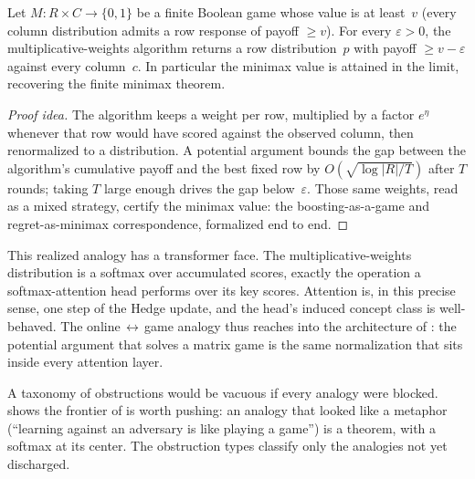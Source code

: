 \begin{thm}
\label{thm:mwu-minimax}
Let $M \colon R \times C \to \{0,1\}$ be a finite Boolean game whose value
is at least~$v$ (every column distribution admits a row response of payoff
$\geq v$). For every $\varepsilon > 0$, the multiplicative-weights
algorithm returns a row distribution~$p$ with payoff $\geq v - \varepsilon$
against every column~$c$. In
particular the minimax value is attained in the limit, recovering the
finite minimax theorem.
\end{thm}

\begin{proof}[Proof idea]
The algorithm keeps a weight per row, multiplied by a factor $e^{\eta}$
whenever that row would have scored against the observed column, then
renormalized to a distribution. A potential argument bounds the gap
between the algorithm's cumulative payoff and the best fixed row by
$O(\sqrt{\log|R| / T})$ after $T$ rounds; taking $T$ large enough drives
the gap below~$\varepsilon$. Those same weights, read as a mixed strategy,
certify the minimax value: the boosting-as-a-game and regret-as-minimax
correspondence, formalized end to end.
\end{proof}

This realized analogy has a transformer face. The multiplicative-weights
distribution is a softmax over accumulated scores, exactly the operation
a softmax-attention head performs over its key scores. Attention is, in
this precise sense, one step of the Hedge update, and the head's induced
concept class is
well-behaved. The
online$\,\leftrightarrow\,$game analogy thus reaches into the architecture
of : the potential argument that solves a matrix
game is the same normalization that sits inside every attention layer.

\begin{remark}
\label{rem:realized-matters}
A taxonomy of obstructions would be vacuous if every analogy were blocked.
 shows the frontier of  is
worth pushing: an analogy that looked like a metaphor (``learning against an
adversary is like playing a game'') is a theorem, with a softmax at its
center. The obstruction types classify only the analogies not yet discharged.
\end{remark}


